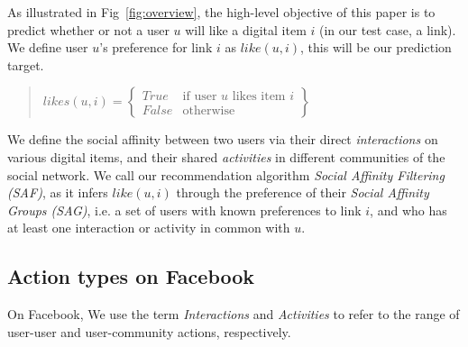 
\label{sec:methodology}

As illustrated in Fig~\ref{fig:overview}, the high-level objective of this paper is to predict whether or not a user $u$ will like a digital item $i$ (in our test case, a link). 
We define user $u$'s preference for link $i$ as $like(u,i)$, this will be our prediction target. 
\begin{quote}
\begin{math}
likes(u,i) =  \begin{Bmatrix}
	  True & \text{if user $u$ likes item $i$}\\
	  False & \text{otherwise}
	  \end{Bmatrix}
\end{math}
\end{quote}

We define the social affinity between two users via their direct {\em interactions}
on various digital items, and their shared {\em activities} in different communities of the social network. 
We call our recommendation algorithm \textit{Social Affinity Filtering (SAF)}, as it infers 
$like(u,i)$ through the preference of their 
\textit{ Social Affinity Groups (SAG)}, i.e. a set of users with known preferences to link $i$, and who has at least one interaction or activity in common with $u$. 

\subsection{Action types on Facebook}
On Facebook, We use the term {\em Interactions} and {\em Activities} to refer to the range of user-user and user-community actions, respectively.

